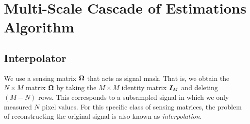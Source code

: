 \chapter{Multi-Scale Cascade of Estimations Algorithm}
\label{ch:msce}



\section{Interpolator}
We use a sensing matrix $\boldsymbol\Omega$ that acts as signal mask. That is, we obtain the $N\times M$ matrix $\boldsymbol\Omega$ by taking the $M\times M$ identity matrix $\boldsymbol I_M$ and deleting $(M-N)$ rows. This corresponds to a subsampled signal in which we only measured $N$ pixel values. For this specific class of sensing matrices, the problem of reconstructing the original signal is also known as \emph{interpolation}.

